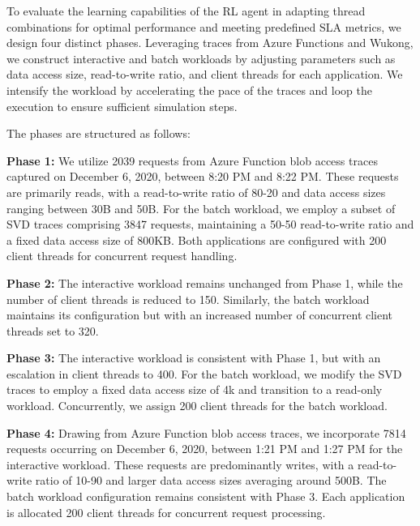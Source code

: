 \label{appendix:c}

To evaluate the learning capabilities of the RL agent in adapting thread combinations for optimal performance and meeting predefined SLA metrics, we design four distinct phases. Leveraging traces from Azure Functions and Wukong, we construct interactive and batch workloads by adjusting parameters such as data access size, read-to-write ratio, and client threads for each application. We intensify the workload by accelerating the pace of the traces and loop the execution to ensure sufficient simulation steps.

The phases are structured as follows:

\textbf{Phase 1:} We utilize 2039 requests from Azure Function blob access traces captured on December 6, 2020, between 8:20 PM and 8:22 PM. These requests are primarily reads, with a read-to-write ratio of 80-20 and data access sizes ranging between 30B and 50B. For the batch workload, we employ a subset of SVD traces comprising 3847 requests, maintaining a 50-50 read-to-write ratio and a fixed data access size of 800KB. Both applications are configured with 200 client threads for concurrent request handling.

\textbf{Phase 2:} The interactive workload remains unchanged from Phase 1, while the number of client threads is reduced to 150. Similarly, the batch workload maintains its configuration but with an increased number of concurrent client threads set to 320.

\textbf{Phase 3:} The interactive workload is consistent with Phase 1, but with an escalation in client threads to 400. For the batch workload, we modify the SVD traces to employ a fixed data access size of 4k and transition to a read-only workload. Concurrently, we assign 200 client threads for the batch workload.

\textbf{Phase 4:} Drawing from Azure Function blob access traces, we incorporate 7814 requests occurring on December 6, 2020, between 1:21 PM and 1:27 PM for the interactive workload. These requests are predominantly writes, with a read-to-write ratio of 10-90 and larger data access sizes averaging around 500B. The batch workload configuration remains consistent with Phase 3. Each application is allocated 200 client threads for concurrent request processing.



